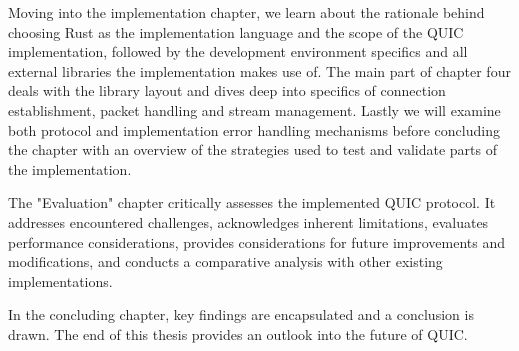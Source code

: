 Moving into the implementation chapter, we learn about the rationale behind choosing Rust as the implementation language and the scope of the QUIC implementation, followed by the development environment specifics and all external libraries the implementation makes use of. The main part of chapter four deals with the library layout and dives deep into specifics of connection establishment, packet handling and stream management. Lastly we will examine both protocol and implementation error handling mechanisms before concluding the chapter with an overview of the strategies used to test and validate parts of the implementation.

The "Evaluation" chapter critically assesses the implemented QUIC protocol. It addresses encountered challenges, acknowledges inherent limitations, evaluates performance considerations, provides considerations for future improvements and modifications, and conducts a comparative analysis with other existing implementations.

In the concluding chapter, key findings are encapsulated and a conclusion is drawn. The end of this thesis provides an outlook into the future of QUIC.
